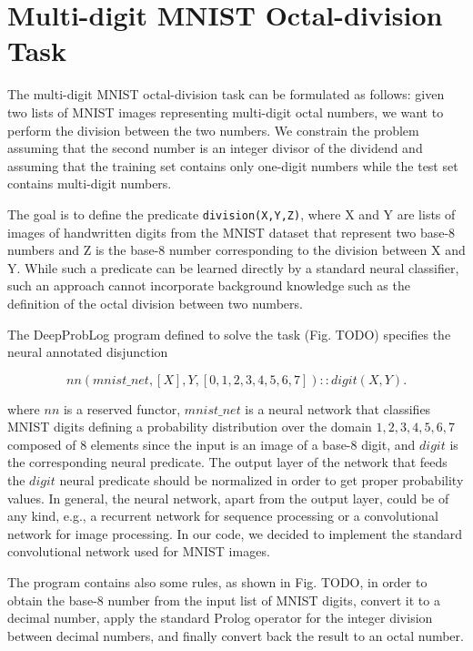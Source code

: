 \section{Multi-digit MNIST Octal-division Task}
The multi-digit MNIST octal-division task can be formulated as follows: given two lists of MNIST images representing multi-digit octal numbers, we want to perform the division between the two numbers. We constrain the problem assuming that the second number is an integer divisor of the dividend and assuming that the training set contains only one-digit numbers while the test set contains multi-digit numbers.

The goal is to define the predicate \texttt{division(X,Y,Z)}, where X and Y are lists of images of handwritten digits from the MNIST dataset that represent two base-8 numbers and Z is the base-8 number corresponding to the division between X and Y. While such a predicate can be learned directly by a standard neural classifier, such an approach cannot incorporate background knowledge such as the definition of the octal division between two numbers.

The DeepProbLog program defined to solve the task (Fig. TODO) specifies the neural annotated disjunction

\begin{equation}
    nn(mnist\_net,[X],Y,[0,1,2,3,4,5,6,7]) :: digit(X,Y).
\end{equation}

where $nn$ is a reserved functor, $mnist\_net$ is a neural network that classifies MNIST digits defining a probability distribution over the domain ${1,2,3,4,5,6,7}$ composed of 8 elements since the input is an image of a base-8 digit, and $digit$ is the corresponding neural predicate. The output layer of the network that feeds the $digit$ neural predicate should be normalized in order to get proper probability values. In general, the neural network, apart from the output layer, could be of any kind, e.g., a recurrent network for sequence processing or a convolutional network for image processing. In our code, we decided to implement the standard convolutional network used for MNIST images. %

The program contains also some rules, as shown in Fig. TODO, in order to obtain the base-8 number from the input list of MNIST digits, convert it to a decimal number, apply the standard Prolog operator for the integer division between decimal numbers, and finally convert back the result to an octal number.


